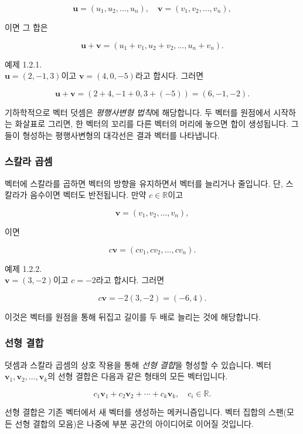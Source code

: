 \documentclass[
  12pt,
  a4paper,
]{article}
\begin{document}
\[\mathbf{u} = (u_1, u_2, \dots, u_n), \quad
\mathbf{v} = (v_1, v_2, \dots, v_n),\]

이면 그 합은

\[\mathbf{u} + \mathbf{v} = (u_1+v_1, u_2+v_2, \dots, u_n+v_n).\]

예제 1.2.1.\\
\(\mathbf{u} = (2, -1, 3)\)이고 \(\mathbf{v} = (4, 0, -5)\)라고 합시다. 그러면

\[\mathbf{u} + \mathbf{v} = (2+4, -1+0, 3+(-5)) = (6, -1, -2).\]

기하학적으로 벡터 덧셈은 \emph{평행사변형 법칙}에 해당합니다. 두 벡터를 원점에서 시작하는 화살표로 그리면, 한 벡터의 꼬리를 다른 벡터의 머리에 놓으면 합이 생성됩니다. 그들이 형성하는 평행사변형의 대각선은 결과 벡터를 나타냅니다.

\subsubsection{스칼라 곱셈}\label{scalar-multiplication}

벡터에 스칼라를 곱하면 벡터의 방향을 유지하면서 벡터를 늘리거나 줄입니다. 단, 스칼라가 음수이면 벡터도 반전됩니다. 만약 \(c \in \mathbb{R}\)이고

\[\mathbf{v} = (v_1, v_2, \dots, v_n),\]

이면

\[c \mathbf{v} = (c v_1, c v_2, \dots, c v_n).\]

예제 1.2.2.\\
\(\mathbf{v} = (3, -2)\)이고 \(c = -2\)라고 합시다. 그러면

\[c\mathbf{v} = -2(3, -2) = (-6, 4).\]

이것은 벡터를 원점을 통해 뒤집고 길이를 두 배로 늘리는 것에 해당합니다.

\subsubsection{선형 결합}\label{linear-combinations}

덧셈과 스칼라 곱셈의 상호 작용을 통해 \emph{선형 결합}을 형성할 수 있습니다. 벡터 \(\mathbf{v}_1, \mathbf{v}_2, \dots, \mathbf{v}_k\)의 선형 결합은 다음과 같은 형태의 모든 벡터입니다.

\[c_1 \mathbf{v}_1 + c_2 \mathbf{v}_2 + \cdots + c_k \mathbf{v}_k, \quad c_i \in \mathbb{R}.\]

선형 결합은 기존 벡터에서 새 벡터를 생성하는 메커니즘입니다. 벡터 집합의 스팬(모든 선형 결합의 모음)은 나중에 부분 공간의 아이디어로 이어질 것입니다.
\end{document}

